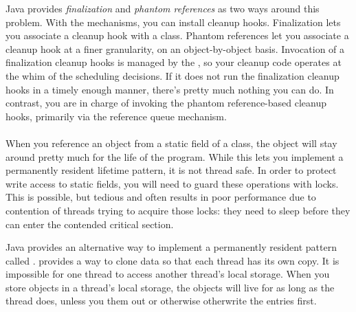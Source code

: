 Java provides \emph{finalization} and \emph{phantom references} as two ways
around this problem. With the
mechanisms, you can install cleanup hooks. Finalization lets you associate a
cleanup hook with a class. Phantom references let you associate a cleanup hook
at a finer granularity, on an object-by-object basis. Invocation of a
finalization cleanup hooks is managed by the \jre, so your cleanup code operates
at the whim of the \jres scheduling decisions. If it does not run the
finalization cleanup hooks in a timely enough manner, there's pretty much
nothing you can do. In contrast, you are in charge of invoking the phantom
reference-based cleanup hooks, primarily via the reference queue mechanism.


\paragraph{\TLS}
\tlsindex %
\label{sec:thread-local-storage}
When you reference an object from a static field of a class, the object will
stay around pretty much for the life of the program. While this lets you
implement a permanently resident lifetime pattern, it is not thread safe. In
order to protect write access to static fields, you will need to guard these
operations with locks. This is possible, but tedious and often results in poor
performance due to contention of threads trying to acquire those locks: they
need to sleep before they can enter the contended critical section.

Java provides an alternative way to implement a permanently resident pattern
called \emph{\tls\/}. \tls provides a way to clone data so that each thread has
its own copy. It is impossible for one thread to access another thread's local
storage. When you store objects in a thread's local storage, the objects will
live for as long as the thread does, unless you  them out or
otherwise otherwrite the entries first.

